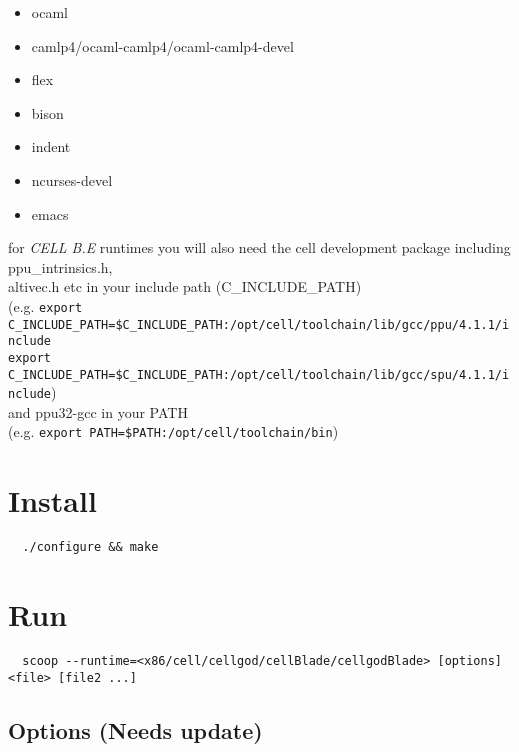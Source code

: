 \documentclass[letterpaper]{article}
\begin{document}
\begin{itemize}
  \setlength{\itemsep}{1pt}
  \setlength{\parskip}{0pt}
  \setlength{\parsep}{0pt}
  \item ocaml
  \item camlp4/ocaml-camlp4/ocaml-camlp4-devel
  \item flex
  \item bison
  \item indent
  \item ncurses-devel
  \item emacs
\end{itemize}

\begin{tabbing}
for \emph{CELL B.E} runtimes you will also need the cell development package
including ppu\_intrinsics.h,\\ altivec.h etc in your include path
(C\_INCLUDE\_PATH)\\
  (e.g. \=\verb!export C_INCLUDE_PATH=$C_INCLUDE_PATH:/opt/cell/toolchain/lib/gcc/ppu/4.1.1/include!\\
   \>\verb!export C_INCLUDE_PATH=$C_INCLUDE_PATH:/opt/cell/toolchain/lib/gcc/spu/4.1.1/include!)\\
  and ppu32-gcc in your PATH\\
  (e.g. \verb!export PATH=$PATH:/opt/cell/toolchain/bin!)\\
\end{tabbing}

\section{Install}

  \verb!  ./configure && make!

\section{Run}

  \verb!  scoop --runtime=<x86/cell/cellgod/cellBlade/cellgodBlade> [options] <file> [file2 ...]!

\subsection{Options (Needs update)}
\end{document}
